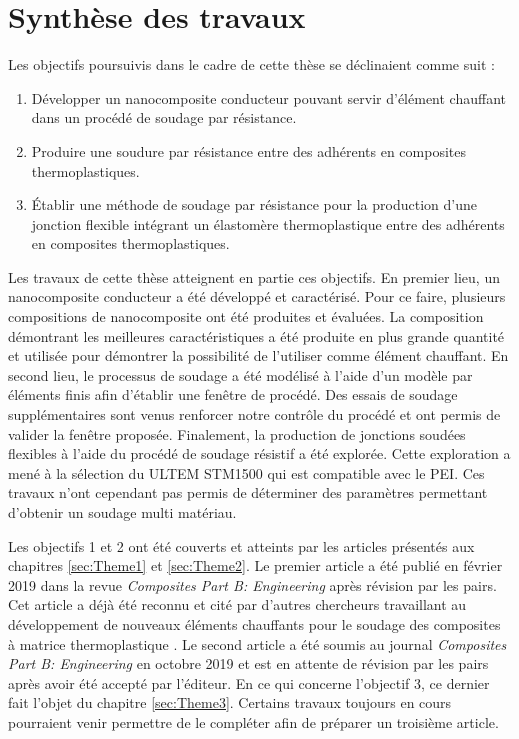 \label{sec:Contributions}

\section{Synthèse des travaux}

Les objectifs poursuivis dans le cadre de cette thèse se déclinaient comme suit : 

\begin{enumerate}
	\item Développer un nanocomposite conducteur pouvant servir d'élément chauffant dans un procédé de soudage par résistance. 
	\item Produire une soudure par résistance entre des adhérents en composites thermoplastiques. 
	\item Établir une méthode de soudage par résistance pour la production d'une jonction flexible intégrant un élastomère thermoplastique entre des adhérents en composites thermoplastiques. 
\end{enumerate}

Les travaux de cette thèse atteignent en partie ces objectifs. 
En premier lieu, un nanocomposite conducteur a été développé et caractérisé. 
Pour ce faire, plusieurs compositions de nanocomposite ont été produites et évaluées. 
La composition démontrant les meilleures caractéristiques a été produite en plus grande quantité et utilisée pour démontrer la possibilité de l'utiliser comme élément chauffant. 
En second lieu, le processus de soudage a été modélisé à l'aide d'un modèle par éléments finis afin d'établir une fenêtre de procédé. 
Des essais de soudage supplémentaires sont venus renforcer notre contrôle du procédé et ont permis de valider la fenêtre proposée. 
Finalement, la production de jonctions soudées flexibles à l'aide du procédé de soudage résistif a été explorée. 
Cette exploration a mené à la sélection du ULTEM STM1500 qui est compatible avec le PEI. 
Ces travaux n'ont cependant pas permis de déterminer des paramètres permettant d'obtenir un soudage multi matériau. 

Les objectifs 1 et 2 ont été couverts et atteints par les articles présentés aux chapitres \ref{sec:Theme1} et \ref{sec:Theme2}. 
Le premier article \cite{Brassard2019a} a été publié en février 2019 dans la revue \textit{Composites Part B: Engineering} après révision par les pairs. 
Cet article a déjà été reconnu et cité par d'autres chercheurs travaillant au développement de nouveaux éléments chauffants pour le soudage des composites à matrice thermoplastique \cite{Russello2019}. 
Le second article a été soumis au journal \textit{Composites Part B: Engineering} en octobre 2019 et est en attente de révision par les pairs après avoir été accepté par l'éditeur. 
En ce qui concerne l'objectif 3, ce dernier fait l'objet du chapitre \ref{sec:Theme3}. 
Certains travaux toujours en cours pourraient venir permettre de le compléter afin de préparer un troisième article.


